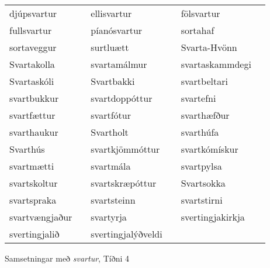 \documentclass[../samsetningasafn.tex]{subfiles}
\begin{document}
\begin{wordlist}[H]
\begin{tcolorbox}
	\setlength{\extrarowheight}{3pt}
	\begin{tabular}{BlBlBl}	
		djúpsvartur	& 	\phantom{ba}	& 	
		ellisvartur		& \phantom{ba}	& 	
		fölsvartur		& \phantom{ba}	\\ 	
		fullsvartur		& 		& 	
		píanósvartur 	& 		& 
		sortahaf		& 		\\ 	
		sortaveggur 	& 		& 	
		surtluætt		& 		& 	
		Svarta-Hvönn & 		\\ 
		Svartakolla 	& 		& 	
		svartamálmur & 		& 
		svartaskammdegi & 	\\ 
		Svartaskóli 	& 		& 	
		Svartbakki	& 		& 	
		svartbeltari	& 	\\ 	
		svartbukkur 	& 	& 	
		svartdoppóttur & 	& 
		svartefni		& 	\\ 	
		svartfættur	& 		& 	
		svartfótur	& 		& 	
		svarthæfður & 		\\ 
		svarthaukur & 		& 	
		Svartholt		& 		& 
		svarthúfa		& 		\\ 	
		Svarthús		& 		& 	
		svartkjömmóttur & 	& 	
		svartkómískur 	& 		\\ 
		svartmætti	& 		& 	
		svartmála	& 		& 	
		svartpylsa 	& 		\\ 	
		svartskoltur & 		& 	
		svartskræpóttur & 	& 
		Svartsokka & 		\\ 	
		svartspraka & 		& 	
		svartsteinn	& 		& 	
		svartstirni		& 		\\ 	
		svartvængjaður & 	& 	
		svartyrja 		& 		& 	
		svertingjakirkja 	& 	\\ 
		svertingjalið & 		& 	
		svertingjalýðveldi & 	& 	
					& 		
	\end{tabular}
\end{tcolorbox}
	\caption{Samsetningar með \textit{svartur}, Tíðni 4}
	\label{listi:svart.4}
\end{wordlist}
\end{document}
